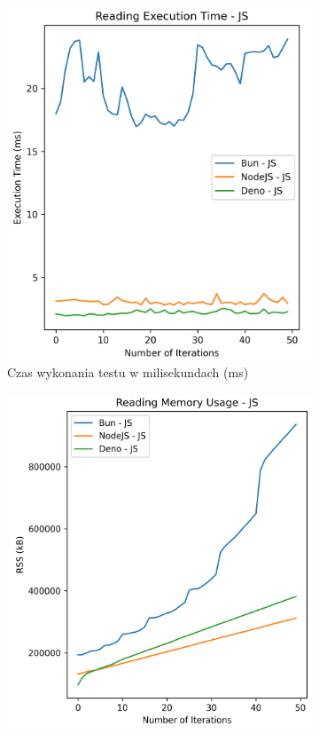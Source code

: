 \begin{figure}[H]
  \centering
  \begin{subfigure}[b]{0.44\textwidth}
    \centering
    \includegraphics[width=\textwidth]{Figures/files/files_writing_50_2000_50_js_time.png}
    \caption{Czas wykonania testu w milisekundach (ms)}
    \label{fig:file_e2_writing_js_time}
  \end{subfigure}
  \begin{subfigure}[b]{0.44\textwidth}
    \centering
    \includegraphics[width=\textwidth]{Figures/files/files_writing_50_2000_50_js_memory.png}

\end{subfigure}
\end{figure}
